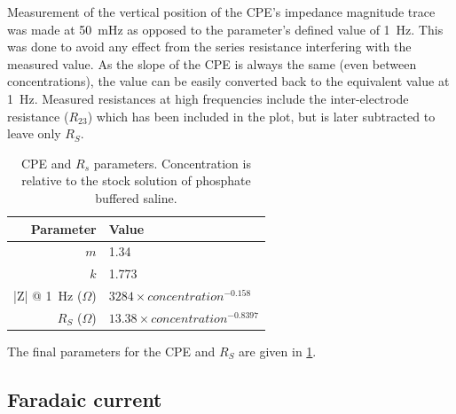       Measurement of the vertical position of the CPE's impedance magnitude trace was made at \SI{50}{\milli\hertz} as opposed to the parameter's defined value of \SI{1}{\hertz}.
      This was done to avoid any effect from the series resistance interfering with the measured value.
      As the slope of the CPE is always the same (even between concentrations), the value can be easily converted back to the equivalent value at \SI{1}{\hertz}.
      Measured resistances at high frequencies include the inter-electrode resistance ($R_{23}$) which has been included in the plot, but is later subtracted to leave only $R_{S}$.
      \begin{table}
        \centering
        \begin{tabular}{r | l}
          Parameter & Value \\
          \hline
          $m$& 1.34\\
          $k$ & 1.773\\
          |Z| @ \SI{1}{\hertz} ($\Omega$)& $3284 \times concentration^{-0.158}$ \\
          $R_{S}$ ($\Omega$)& $13.38 \times concentration^{-0.8397}$
        \end{tabular}
        \caption{\label{tab:CPEparams}CPE and $R_{s}$ parameters. Concentration is relative to the stock solution of phosphate buffered saline.}
      \end{table}
      The final parameters for the CPE and $R_{S}$ are given in \cref{tab:CPEparams}.



    \subsection{Faradaic current}
      \label{sect:pt2-faradaicCurrent_PBS}

